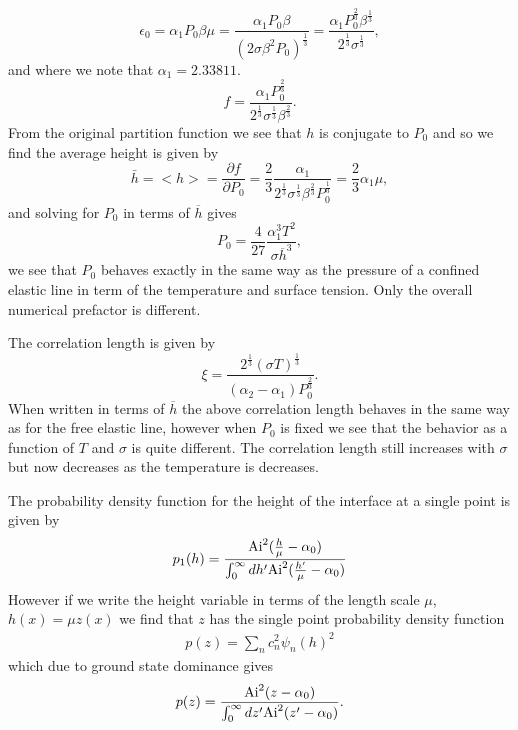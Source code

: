 \begin{equation}
    \epsilon_0 = \alpha_1P_0\beta\mu= \frac{\alpha_1P_0\beta}{(2\sigma\beta^2P_0)^\frac{1}{3}}= \frac{\alpha_1 P_0^\frac{2}{3}\beta^\frac{1}{3}}{2^\frac{1}{3} \sigma^\frac{1}{3}},
\end{equation}
and where we note that $\alpha_1 = 2.33811$.
\begin{equation}
    f= \frac{\alpha_1 P_0^\frac{2}{3}}{2^\frac{1}{3} \sigma^\frac{1}{3}\beta^\frac{2}{3}}.
\end{equation}
From the original partition function we see that $h$ is conjugate to $P_0$ and so we find the average height is given by
\begin{equation}
    \bar h= < h> = \frac{\partial f}{\partial P_0} = \frac{2}{3}\frac{\alpha_1 }{2^\frac{1}{3} \sigma^\frac{1}{3}\beta^\frac{2}{3}P_0^\frac{1}{3}} = \frac{2}{3}\alpha_1\mu,\label{h1}
\end{equation}
and solving for $P_0$ in terms of $\overline h$ gives
\begin{equation}
    P_0 = \frac{4}{27}\frac{\alpha_1^3 T^2}{\sigma \overline h^3},
\end{equation}
we see that $P_0$ behaves exactly in the same way as the pressure of a confined elastic line
in term of the temperature and surface tension. Only the overall numerical prefactor is different.

The correlation length is given by
\begin{equation}
    \xi = \frac{2^\frac{1}{3}(\sigma T)^\frac{1}{3}}{(\alpha_2-\alpha_1)P_0^\frac{2}{3}}.
\end{equation}
When written in terms of $\overline h$ the above correlation length behaves in the same way
as for the free elastic line, however when $P_0$ is fixed we see that the behavior as a function 
of $T$ and $\sigma$ is quite different. The correlation length still increases with $\sigma$ but now decreases as the temperature is decreases.

The probability density function for the height of the interface at a single point is given
by
\begin{equation}
    p_1(h) = \frac{{\rm Ai}^2(\frac{h}{\mu}-\alpha_0)}{\int_0^\infty dh' {\rm Ai}^2(\frac{h'}{\mu}-\alpha_0)}
    \label{p-airy}
\end{equation}
However if we write the height variable in terms of the length scale $\mu$, $h(x)= \mu z(x)$ we find that $z$ has the single point probability density function
{\color{red}
\begin{align}
    p(z) = \sum_n c_n^2 \psi_n(h)^2
\end{align}
which due to ground state dominance gives }
\begin{equation}
    p(z)= \frac{{\rm Ai}^2(z-\alpha_0)}{\int_0^\infty dz' {\rm Ai}^2(z'-\alpha_0)}.
\end{equation}

